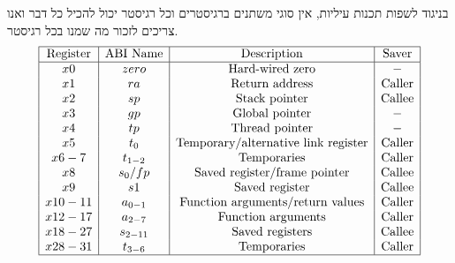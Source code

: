 \documentclass[12pt]{article}
\theoremstyle{plain}
\theoremstyle{definition}
\theoremstyle{remark}
\begin{document}
בניגוד לשפות תכנות עיליות, אין סוגי משתנים ברגיסטרים וכל רגיסטר יכול להכיל כל דבר ואנו צריכים לזכור מה שמנו בכל רגיסטר.\[
{\begin{array}{|c|c|c|c|}
\hline \text{Register} & \text{ABI Name} & \text{Description} & \text{Saver} \\
\hline x0 & zero & \text{Hard-wired zero} & - \\
x1 & ra & \text{Return address} & \text{Caller} \\
x2 & sp & \text{Stack pointer} & \text{Callee} \\
x3 & gp & \text{Global pointer} & - \\
x4 & tp & \text{Thread pointer} & - \\
x5 & t_{0} & \text{Temporary/alternative link register} & \text{Caller} \\
x6-7 & t_{1-2} & \text{Temporaries} & \text{Caller} \\
x8 & s_{0}/fp & \text{Saved register/frame pointer} & \text{Callee} \\
x9 & s1 & \text{Saved register} & \text{Callee} \\
x10-11 & a_{0-1} & \text{Function arguments/return values} & \text{Caller} \\
x12-17 & a_{2-7} & \text{Function arguments} & \text{Caller} \\
x18-27 & s_{2-11} & \text{Saved registers} & \text{Callee} \\
x28-31 & t_{3-6} & \text{Temporaries} & \text{Caller} \\
\hline
\end{array}}
\]
\end{document}
